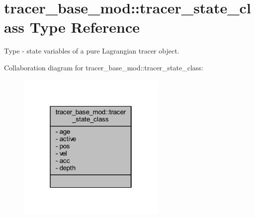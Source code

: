 \hypertarget{structtracer__base__mod_1_1tracer__state__class}{}\section{tracer\+\_\+base\+\_\+mod\+:\+:tracer\+\_\+state\+\_\+class Type Reference}
\label{structtracer__base__mod_1_1tracer__state__class}


Type -\/ state variables of a pure Lagrangian tracer object.  




Collaboration diagram for tracer\+\_\+base\+\_\+mod\+:\+:tracer\+\_\+state\+\_\+class\+:\nopagebreak
\begin{figure}[H]
\begin{center}
\leavevmode
\includegraphics[width=202pt]{structtracer__base__mod_1_1tracer__state__class__coll__graph}
\end{center}
\end{figure}
